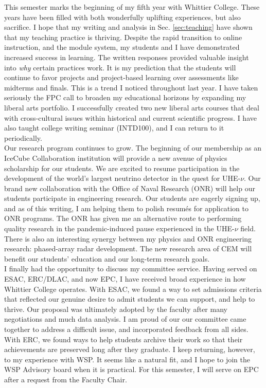 \documentclass[../main.tex]{subfiles}
\begin{document}
This semester marks the beginning of my fifth year with Whittier College.  These years have been filled with both wonderfully uplifting experiences, but also sacrifice.  I hope that my writing and analysis in Sec. \ref{sec:teaching} have shown that my teaching practice is thriving.  Despite the rapid transition to online instruction, and the module system, my students and I have demonstrated increased success in learning.  The written responses provided valuable insight into \textit{why} certain practices work.  It is my prediction that the students will continue to favor projects and project-based learning over assessments like midterms and finals.  This is a trend I noticed throughout last year.  I have taken seriously the FPC call to broaden my educational horizons by expanding my liberal arts portfolio.  I successfully created two new liberal arts courses that deal with cross-cultural issues within historical and current scientific progress.  I have also taught college writing seminar (INTD100), and I can return to it periodically.
\\
\vspace{0.15cm}
Our research program continues to grow.  The beginning of our membership as an IceCube Collaboration institution will provide a new avenue of physics scholarship for our students.  We are excited to resume participation in the development of the world's largest neutrino detector in the quest for UHE-$\nu$.  Our brand new collaboration with the Office of Naval Research (ONR) will help our students participate in engineering research.  Our students are eagerly signing up, and as of this writing, I am helping them to polish resum\'{e}s for application to ONR programs.  The ONR has given me an alternative route to performing quality research in the pandemic-induced pause experienced in the UHE-$\nu$ field.  There is also an interesting synergy between my physics and ONR engineering research: phased-array radar development.  The new research area of CEM will benefit our students' education and our long-term research goals.
\\
\vspace{0.15cm}
I finally had the opportunity to discuss my committee service.  Having served on ESAC, ERC/DLAC, and now EPC, I have received broad experience in how Whittier College operates.  With ESAC, we found a way to set admissions criteria that reflected our genuine desire to admit students we can support, and help to thrive.  Our proposal was ultimately adopted by the faculty after many negotiations and much data analysis.  I am proud of our our committee came together to address a difficult issue, and incorporated feedback from all sides.  With ERC, we found ways to help students archive their work so that their achievements are preserved long after they graduate.  I keep returning, however, to my experience with WSP.  It seems like a natural fit, and I hope to join the WSP Advisory board when it is practical.  For this semester, I will serve on EPC after a request from the Faculty Chair.
\end{document}

